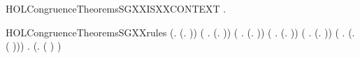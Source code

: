 \newcommand{\HOLCongruenceTheoremsSGXXind}{\UseVerbatim{HOLCongruenceTheoremsSGXXind}}
\begin{SaveVerbatim}{HOLCongruenceTheoremsSGXXISXXCONTEXT}
\HOLTokenTurnstile{} \HOLSymConst{\HOLTokenForall{}}.   \HOLSymConst{\HOLTokenImp{}}  
\end{SaveVerbatim}
\newcommand{\HOLCongruenceTheoremsSGXXISXXCONTEXT}{\UseVerbatim{HOLCongruenceTheoremsSGXXISXXCONTEXT}}
\begin{SaveVerbatim}{HOLCongruenceTheoremsSGXXrules}
\HOLTokenTurnstile{} (\HOLSymConst{\HOLTokenForall{}}.  (\HOLTokenLambda{}. )) \HOLSymConst{\HOLTokenConj{}}
   (\HOLSymConst{\HOLTokenForall{}} .   \HOLSymConst{\HOLTokenImp{}}  (\HOLTokenLambda{}.   )) \HOLSymConst{\HOLTokenConj{}}
   (\HOLSymConst{\HOLTokenForall{}} .   \HOLSymConst{\HOLTokenImp{}}  (\HOLTokenLambda{}.  )) \HOLSymConst{\HOLTokenConj{}}
   (\HOLSymConst{\HOLTokenForall{}} .   \HOLSymConst{\HOLTokenConj{}}   \HOLSymConst{\HOLTokenImp{}}  (\HOLTokenLambda{}.   \HOLSymConst{\ensuremath{+}}  )) \HOLSymConst{\HOLTokenConj{}}
   (\HOLSymConst{\HOLTokenForall{}} .   \HOLSymConst{\HOLTokenConj{}}   \HOLSymConst{\HOLTokenImp{}}  (\HOLTokenLambda{}.   \HOLSymConst{\ensuremath{\parallel}}  )) \HOLSymConst{\HOLTokenConj{}}
   (\HOLSymConst{\HOLTokenForall{}} .   \HOLSymConst{\HOLTokenImp{}}  (\HOLTokenLambda{}. \HOLConst{\ensuremath{\nu}}  ( ))) \HOLSymConst{\HOLTokenConj{}}
   \HOLSymConst{\HOLTokenForall{}} .   \HOLSymConst{\HOLTokenImp{}}  (\HOLTokenLambda{}.  ( ) )
\end{SaveVerbatim}
